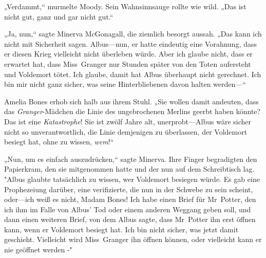 „Verdammt,“ murmelte Moody. Sein Wahnsinnsauge rollte wie wild. „Das ist nicht gut, ganz und gar nicht gut.“

„Ja, nun,“ sagte Minerva McGonagall, die ziemlich besorgt aussah. „Das kann ich nicht mit Sicherheit sagen. Albus—nun, er hatte eindeutig eine Vorahnung, dass er diesen Krieg vielleicht nicht überleben würde. Aber ich glaube nicht, dass er erwartet hat, dass Miss~Granger nur Stunden später von den Toten aufersteht und Voldemort tötet. Ich glaube, damit hat Albus überhaupt nicht gerechnet. Ich bin mir nicht ganz sicher, was seine Hinterbliebenen davon halten werden—“

Amelia Bones erhob sich halb aus ihrem Stuhl.
„Sie wollen damit andeuten, dass das \emph{Granger}-Mädchen die Linie des ungebrochenen Merlins geerbt haben könnte? Das ist eine \emph{Katastrophe}! Sie ist zwölf Jahre alt, unerprobt—Albus wäre sicher nicht so unverantwortlich, die Linie demjenigen zu überlassen, der Voldemort besiegt hat, ohne zu wissen, \emph{wem}!“

„Nun, um es einfach auszudrücken,“ sagte Minerva.
Ihre Finger begradigten den Papierkram, den sie mitgenommen hatte und der nun auf dem Schreibtisch lag. "Albus glaubte tatsächlich zu wissen, wer Voldemort besiegen würde. Es gab eine Prophezeiung darüber, eine verifizierte, die nun in der Schwebe zu sein scheint, oder—ich weiß es nicht, Madam Bones! Ich habe einen Brief für Mr~Potter, den ich ihm im Falle von Albus' Tod oder einem anderen Weggang geben soll, und dann einen weiteren Brief, von dem Albus sagte, dass Mr~Potter ihn erst öffnen kann, wenn er Voldemort besiegt hat. Ich bin nicht sicher, was jetzt damit geschieht.
Vielleicht wird Miss~Granger ihn öffnen können, oder vielleicht kann er nie geöffnet werden -"

